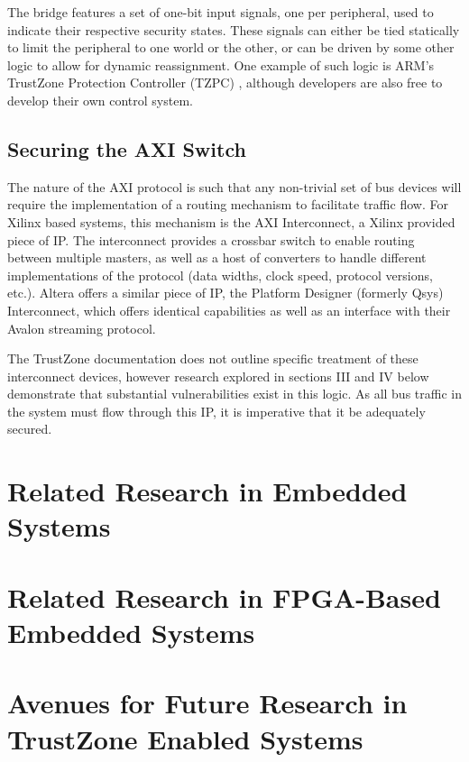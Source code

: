 \documentclass[journal]{IEEEtran}
\begin{document}
The bridge features a set of one-bit input signals, one per peripheral, used to indicate
their respective security states. These signals can either be tied statically to limit
the peripheral to one world or the other, or can be driven by some other logic to allow
for dynamic reassignment. One example of such logic is ARM's TrustZone Protection 
Controller (TZPC) \cite{noauthor_arm_nodate}, although developers are also free to develop their own control system.

\subsection{Securing the AXI Switch}
The nature of the AXI protocol is such that any non-trivial set of bus devices will
require the implementation of a routing mechanism to facilitate traffic flow. For Xilinx
based systems, this mechanism is the AXI Interconnect, a Xilinx provided piece of IP. 
\cite{noauthor_axi_2017} The interconnect provides a crossbar switch to enable routing 
between multiple masters, as well as a host of converters to handle different 
implementations of the protocol (data widths, clock speed, protocol versions, etc.). 
Altera offers a similar piece of IP, the Platform Designer (formerly Qsys) Interconnect,
which offers identical capabilities as well as an interface with their Avalon streaming
protocol. \cite{noauthor_intel_nodate}

The TrustZone documentation does not outline specific treatment of these interconnect
devices, however research explored in sections III and IV below demonstrate that
substantial vulnerabilities exist in this logic. As all bus traffic in the system must
flow through this IP, it is imperative that it be adequately secured.

\section{Related Research in Embedded Systems}

\section{Related Research in FPGA-Based Embedded Systems}

\section{Avenues for Future Research in TrustZone Enabled Systems}
\end{document}
